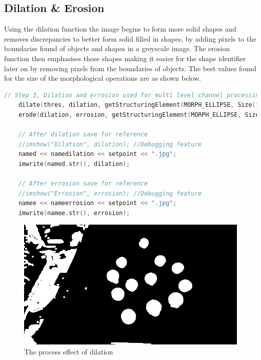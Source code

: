 \documentclass[a4paper, 10pt]{article}
\begin{document}

\subsection{Dilation \& Erosion}

Using the dilation function the image begins to form more solid shapes and removes discrepancies to better form solid filled in shapes, by adding pixels to the boundaries found of objects and shapes in a greyscale image. The erosion function then emphasises those shapes making it easier for the shape identifier later on by removing pixels from the boundaries of objects. The best values found for the size of the morphological operations are as shown below.

\begin{lstlisting}[language = C++]
	// Step 3, Dilation and errosion used for multi level channel processing 
	dilate(thres, dilation, getStructuringElement(MORPH_ELLIPSE, Size(11, 11)));
	erode(dilation, errosion, getStructuringElement(MORPH_ELLIPSE, Size(3, 3)));

	// After dilation save for reference
	//imshow("Dilation", dilation); //Debugging feature
	named << namedilation << setpoint << ".jpg";
	imwrite(named.str(), dilation);

	// After errosion save for reference
	//imshow("Errosion", errosion); //Debugging feature
	namee << nameerrosion << setpoint << ".jpg";
	imwrite(namee.str(), errosion);
\end{lstlisting}

\begin{figure}[H]
  \includegraphics[width=\linewidth]{images/Dilation}
  \caption{The process effect of dilation}
  \label{fig:The process effect of dilation}
\end{figure}
\end{document}
